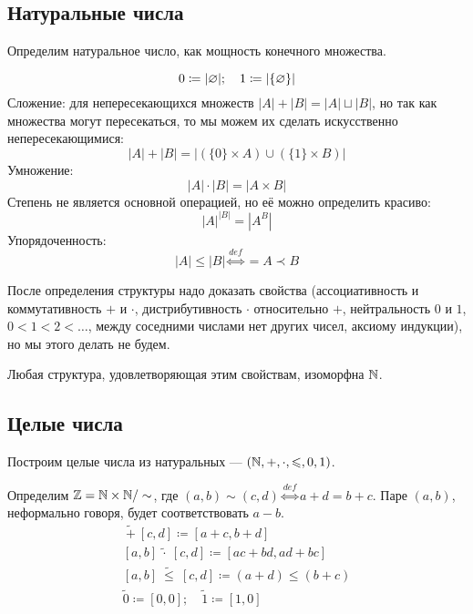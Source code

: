 \documentclass[a4paper]{report}
\begin{document}
    \subsection{Натуральные числа}

    Определим натуральное число, как мощность конечного множества.

    \[0 \coloneqq |\varnothing|; \quad 1 \coloneqq |\{\varnothing\}|\]
    Сложение: для непересекающихся множеств $|A| + |B| = |A| \sqcup |B|$, но так как множества могут пересекаться, то мы можем их сделать искусственно непересекающимися:
    \[|A| + |B| = |(\{0\} \times A) \cup (\{1\} \times B)|\]
    Умножение:
    \[|A| \cdot |B| = |A \times B|\]
    Степень не является основной операцией, но её можно определить красиво: \[|A|^{|B|} = |A^B|\]
    Упорядоченность: \[|A| \le |B| \overset{def}{\iff} = A \prec B\]

    После определения структуры надо доказать свойства (ассоциативность и коммутативность $+$ и $\cdot$, дистрибутивность $\cdot$ относительно $+$, нейтральность $0$ и $1$, $0 < 1 < 2 < \dots$, между соседними числами нет других чисел, аксиому индукции), но мы этого делать не будем.

    Любая структура, удовлетворяющая этим свойствам, изоморфна $\mathbb{N}$.

    \subsection{Целые числа}

    Построим целые числа из натуральных --- $(\mathbb{N}, +, \cdot, \leqslant, 0, 1)$.

    Определим $\mathbb{Z} = \mathbb{N} \times \mathbb{N} / \sim$, где $(a, b) \sim (c, d) \overset{def}{\iff} a + d = b + c$.
    Паре $(a, b)$, неформально говоря, будет соответствовать $a - b$.
    \begin{gather*}
    [a, b]
        ~\tilde{+} ~[c, d] \coloneqq [a + c, b + d]\\
        [a, b]~\tilde{\cdot} ~[c, d] \coloneqq [ac + bd, ad + bc]\\
        [a, b] ~\tilde{\le}~ [c, d] \coloneqq (a + d) \le (b + c)\\
        \tilde{0} \coloneqq [0, 0]; \quad \tilde{1} \coloneqq [1, 0]\\
    \end{gather*}
\end{document}
